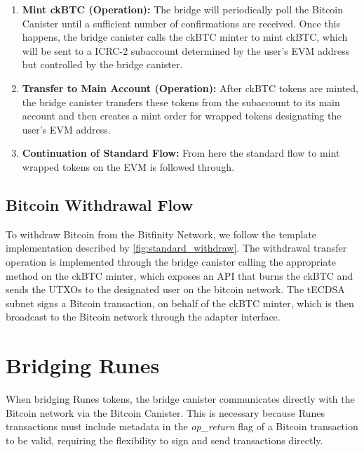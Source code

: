 \documentclass{article}
\begin{document}
    \begin{enumerate}  

        \item{\textbf{Mint ckBTC (Operation):}}
         The bridge will periodically poll the Bitcoin Canister until a sufficient number of confirmations are received.  Once this happens, the bridge canister calls the ckBTC minter to mint ckBTC, which will be sent to a ICRC-2 subaccount determined by the user's EVM address but controlled by the bridge canister. 
        
        \item \textbf{Transfer to Main Account (Operation):} After ckBTC tokens are minted, the bridge canister transfers these tokens from the subaccount to its main account and then creates a mint order for wrapped tokens designating the user's EVM address.


        \item \textbf{Continuation of Standard Flow:} From here the standard flow to mint wrapped tokens on the EVM is followed through.

 \end{enumerate}

 \subsection{Bitcoin Withdrawal Flow}
 
 To withdraw Bitcoin from the Bitfinity Network, we follow the template implementation described by \ref{fig:standard_withdraw}. The withdrawal transfer operation is implemented through the bridge canister calling the appropriate method on the ckBTC minter, which exposes an API that burns the ckBTC  and sends the UTXOs to the designated user on the bitcoin network. The tECDSA subnet signs a Bitcoin transaction, on behalf of the ckBTC minter, which is then broadcast to the Bitcoin network through the adapter interface. 


\section{Bridging Runes}

When bridging Runes tokens, the bridge canister communicates directly with the Bitcoin network via the Bitcoin Canister. This is necessary because Runes transactions must include metadata in the \textit{op\_return} flag of a Bitcoin transaction to be valid, requiring the flexibility to sign and send transactions directly.
\end{document}

